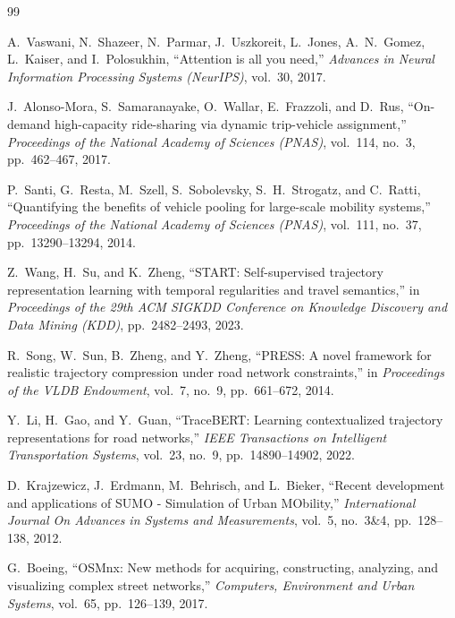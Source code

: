 \documentclass[12pt,a4paper]{article}
\begin{document}
\begin{thebibliography}{99}

A.~Vaswani, N.~Shazeer, N.~Parmar, J.~Uszkoreit, L.~Jones, A.~N.~Gomez, L.~Kaiser, and I.~Polosukhin,
``Attention is all you need,''
\emph{Advances in Neural Information Processing Systems (NeurIPS)}, vol.~30, 2017.

J.~Alonso-Mora, S.~Samaranayake, O.~Wallar, E.~Frazzoli, and D.~Rus,
``On-demand high-capacity ride-sharing via dynamic trip-vehicle assignment,''
\emph{Proceedings of the National Academy of Sciences (PNAS)}, vol.~114, no.~3, pp.~462--467, 2017.

P.~Santi, G.~Resta, M.~Szell, S.~Sobolevsky, S.~H.~Strogatz, and C.~Ratti,
``Quantifying the benefits of vehicle pooling for large-scale mobility systems,''
\emph{Proceedings of the National Academy of Sciences (PNAS)}, vol.~111, no.~37, pp.~13290--13294, 2014.

Z.~Wang, H.~Su, and K.~Zheng,
``START: Self-supervised trajectory representation learning with temporal regularities and travel semantics,''
in \emph{Proceedings of the 29th ACM SIGKDD Conference on Knowledge Discovery and Data Mining (KDD)}, pp.~2482--2493, 2023.

R.~Song, W.~Sun, B.~Zheng, and Y.~Zheng,
``PRESS: A novel framework for realistic trajectory compression under road network constraints,''
in \emph{Proceedings of the VLDB Endowment}, vol.~7, no.~9, pp.~661--672, 2014.

Y.~Li, H.~Gao, and Y.~Guan,
``TraceBERT: Learning contextualized trajectory representations for road networks,''
\emph{IEEE Transactions on Intelligent Transportation Systems}, vol.~23, no.~9, pp.~14890--14902, 2022.

D.~Krajzewicz, J.~Erdmann, M.~Behrisch, and L.~Bieker,
``Recent development and applications of SUMO - Simulation of Urban MObility,''
\emph{International Journal On Advances in Systems and Measurements}, vol.~5, no.~3\&4, pp.~128--138, 2012.

G.~Boeing,
``OSMnx: New methods for acquiring, constructing, analyzing, and visualizing complex street networks,''
\emph{Computers, Environment and Urban Systems}, vol.~65, pp.~126--139, 2017.

\end{thebibliography}
\end{document}
